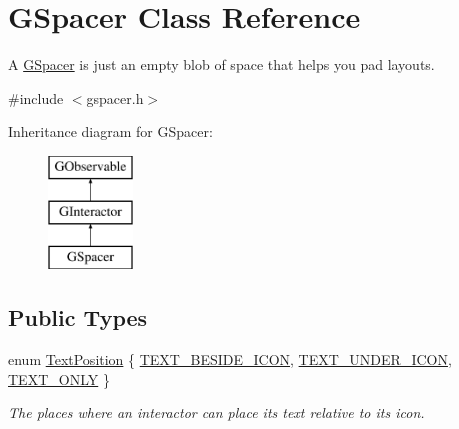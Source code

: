 \hypertarget{classGSpacer}{}\section{G\+Spacer Class Reference}
\label{classGSpacer}


A \mbox{\hyperlink{classGSpacer}{G\+Spacer}} is just an empty blob of space that helps you pad layouts.  




{\ttfamily \#include $<$gspacer.\+h$>$}

Inheritance diagram for G\+Spacer\+:\begin{figure}[H]
\begin{center}
\leavevmode
\includegraphics[height=3.000000cm]{classGSpacer}
\end{center}
\end{figure}
\subsection*{Public Types}
\begin{DoxyCompactItemize}
\item 
enum \mbox{\hyperlink{classGInteractor_a8e0d441725a81d2bbdebbea09078260e}{Text\+Position}} \{ \mbox{\hyperlink{classGInteractor_a8e0d441725a81d2bbdebbea09078260ea4cd6f2e7d5a08d6f4dc052df2358f774}{T\+E\+X\+T\+\_\+\+B\+E\+S\+I\+D\+E\+\_\+\+I\+C\+ON}}, 
\mbox{\hyperlink{classGInteractor_a8e0d441725a81d2bbdebbea09078260eaa88490f63d8de68d44c83bdb2ecde3b3}{T\+E\+X\+T\+\_\+\+U\+N\+D\+E\+R\+\_\+\+I\+C\+ON}}, 
\mbox{\hyperlink{classGInteractor_a8e0d441725a81d2bbdebbea09078260ea39a6f388a30ac4fefb6eb13e846bc9f2}{T\+E\+X\+T\+\_\+\+O\+N\+LY}}
 \}
\begin{DoxyCompactList}\small\item\em The places where an interactor can place its text relative to its icon. \end{DoxyCompactList}\end{DoxyCompactItemize}
